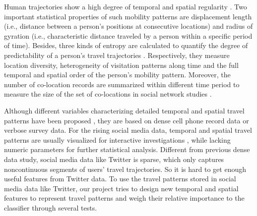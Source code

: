 \documentclass{article}
\begin{document}
Human trajectories show a high degree of temporal and spatial regularity \cite{gonzalez2008understanding}. Two important statistical properties of such mobility patterns are displacement length (i.e., distance between a person's positions at consecutive locations) and radius of gyration (i.e., characteristic distance traveled by a person within a specific period of time)\cite{gonzalez2008understanding}. Besides, three kinds of entropy are  calculated to quantify the degree of predictability of a person's travel trajectories \cite{song2010limits}. Respectively, they measure location diversity, heterogeneity of visitation patterns along time and the full  temporal and spatial order of the person's mobility pattern. Moreover, the number of co-location records  are summarized within different time period to measure the size of the set of co-locations in social network studies \cite{cranshaw2010bridging}. 

Although different variables characterizing detailed temporal and spatial travel patterns have been proposed , they are based on dense cell phone record data or verbose survey data. For the rising social media data,  temporal and spatial  travel patterns are usually visualized for interactive investigations \cite{yin2016exploring}, while lacking numeric parameters for further statistical analysis. Different from previous dense data study, social media data like Twitter is sparse, which only captures noncontinuous segments of users' travel trajectories. So it  is hard to get enough useful features from Twitter data. To use the travel patterns stored in social media data like Twitter, our project tries to design new temporal and spatial features to represent travel patterns and weigh their relative importance to the classifier through several tests.
\end{document}
